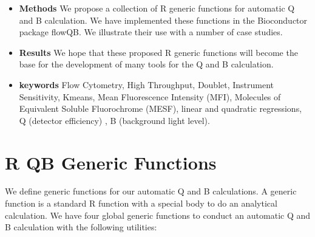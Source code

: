 \documentclass{article}
\begin{document}
\begin{itemize}
\item {\bf Methods} We propose a collection of R generic functions for automatic Q and B calculation. We have implemented these functions in the Bioconductor package flowQB. We illustrate their use with a number of case studies.
\item {\bf Results} We hope that these proposed R generic functions will become the base for the development of many tools for the Q and B calculation.
\item {\bf keywords} Flow Cytometry, High Throughput, Doublet, Instrument Sensitivity, Kmeans, Mean Fluorescence Intensity (MFI),  Molecules of Equivalent Soluble Fluorochrome (MESF), linear and quadratic regressions, Q (detector efficiency) , B (background light level).
\end{itemize}

\section{R QB Generic Functions}

We define generic functions for our automatic Q and B calculations. 
A generic function is a standard R function with a special body to do an analytical calculation.
We have four global generic functions to conduct an automatic Q and B calculation with the following utilities:
\end{document}
